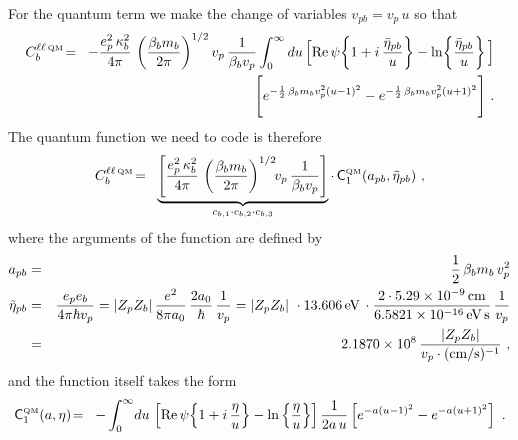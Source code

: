 \documentclass[preprint,12pt,eqsecnum,nofootinbib,amsmath,amssymb]{revtex4}
\newcommand{\smQM}{{\rm\scriptscriptstyle QM}}
\begin{document}
{{For the quantum term we make the change of variables
$v_{pb}= v_p\,u$ so that
\begin{eqnarray}
  C^{\ell\ell \, \smQM}_b
  &\!=\!&  
  -\frac{e_p^2\, \kappa_b^2}{4\pi}\,
  \left( \frac{\beta_b m_b}{2\pi} \right)^{1/2} v_p \, 
  \frac{1}{\beta_b v_p}
  \int_0^\infty du\, 
  \Big[{\rm Re}\,\psi\!\left\{ 1 + i\, \frac{\bar\eta_{pb}}{u}
  \right\}
  - \ln\!\left\{\frac{\bar\eta_{pb}}{u} \right\} \Big] 
\nonumber
\\ && \hskip2.5cm
  \Bigg[ e^{-\frac{1}{2}\,\beta_b m_b v_p^2 (u-1)^2} 
  -
  e^{-\frac{1}{2}\,\beta_b m_b v_p^2 (u+1)^2}  
  \Bigg] \ .
\end{eqnarray}
The quantum function we need to code is therefore
\begin{eqnarray}
  C^{\ell \ell \, \smQM}_b
  &\!=\!&  
  \underbrace{
  \left[\frac{e_p^2\, \kappa_b^2}{4\pi}\,
  \left( \frac{\beta_b m_b}{2\pi} \right)^{1/2} \!\! v_p\,
  \frac{1}{\beta_b v_p}
  \right] 
  }_{c_{b, 1} \cdot c_{b, 2} \cdot c_{b, 3}}
  \cdot \,
  {\sf C}_1^\smQM(a_{pb}, \tilde\eta_{pb}) \ ,
\label{qmA}
\end{eqnarray}
where the arguments of the function are defined by 
\begin{eqnarray}
  a_{pb} 
  &=& 
  \frac{1}{2}\,\beta_b m_b\, v_p^2
\\
  \tilde\eta_{pb}
  &=& 
  \frac{e_p e_b}{4 \pi \hbar v_p}
  =
  \vert Z_p Z_b\vert\,\frac{e^2}{8 \pi a_0}\,\frac{2 a_0}{\hbar}\,
  \frac{1}{v_p}
  =
  \vert Z_p Z_b\vert\ \cdot 13.606\,{\rm eV}\,\cdot
  \frac{2 \cdot 5.29 \times 10^{-9}\,{\rm cm}}{6.5821 \times
  10^{-16}\,{\rm eV\,s}}\,
  \frac{1}{v_p}
\nonumber
\\
  &=&
  2.1870 \times 10^8 \, \frac{\vert Z_p Z_b\vert}{v_p
  \cdot ({\rm cm/s})^{-1}} \ ,
\end{eqnarray}
and the function itself takes the form
\begin{eqnarray}
  {\sf C}_1^\smQM(a,\eta)
  &\!=\!&  
  -\int_0^\infty \! du\, 
  \left[{\rm Re}\,\psi\! \left\{1 + i\, \frac{\eta}{u} \right\} - 
  \ln\left\{ \frac{\eta}{u}  \right\} \right]
  \frac{1}{2 a\,u}
  \left[e^{-a(u-1)^2} - e^{-a(u+1)^2} 
  \right] \ .
\label{qmAB}
\end{eqnarray}


}}
\end{document}
